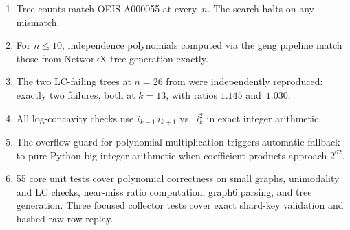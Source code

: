 \documentclass[12pt,oneside]{article}
\theoremstyle{remark}
\begin{document}
\begin{enumerate}
  \item Tree counts match OEIS A000055 at every~$n$.
    The search halts on any mismatch.

  \item For $n \le 10$, independence polynomials computed via the geng pipeline match those from NetworkX tree generation exactly.

  \item The two LC-failing trees at $n = 26$ from \textcite{kadrawi2025} were independently reproduced: exactly two failures, both at $k = 13$, with ratios $1.145$ and~$1.030$.

  \item All log-concavity checks use $i_{k-1}\, i_{k+1}$ vs.\ $i_k^2$ in exact integer arithmetic.

  \item The overflow guard for polynomial multiplication triggers automatic fallback to pure Python big-integer arithmetic when coefficient products approach $2^{62}$.

  \item 55 core unit tests cover polynomial correctness on small graphs, unimodality and LC checks, near-miss ratio computation, graph6 parsing, and tree generation. Three focused collector tests cover exact shard-key validation and hashed raw-row replay.
\end{enumerate}

\clearpage
\begingroup
\setlength{\emergencystretch}{2em}
\printbibliography
\endgroup
\end{document}
